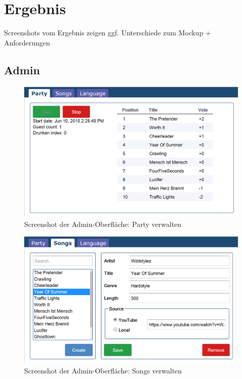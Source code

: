 \section{Ergebnis}

Screenshots vom Ergebnis zeigen
ggf. Unterschiede zum Mockup + Anforderungen

\subsection{Admin}

\begin{figure}[tbh]
\centering
\includegraphics[width=1.0\linewidth]{Bilder/Screenshot-Admin-Party}
\caption{Screenshot der Admin-Oberfläche: Party verwalten}
\label{fig:Screenshot-Admin-Party}
\end{figure}

\begin{figure}[tbh]
\centering
\includegraphics[width=1.0\linewidth]{Bilder/Screenshot-Admin-Songs}
\caption{Screenshot der Admin-Oberfläche: Songs verwalten}
\label{fig:Screenshot-Admin-Songs}
\end{figure}

